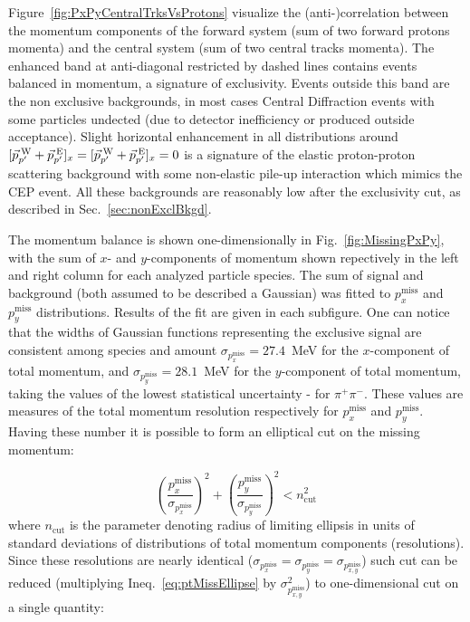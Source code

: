 Figure~\ref{fig:PxPyCentralTrksVsProtons} visualize the (anti-)correlation between the momentum components of the forward system (sum of two forward protons momenta) and the central system (sum of two central tracks momenta). The enhanced band at anti-diagonal restricted by dashed lines contains events balanced in momentum, a signature of exclusivity. Events outside this band are the non exclusive backgrounds, in most cases Central Diffraction events with some particles undected (due to detector inefficiency or produced outside acceptance). Slight horizontal enhancement in all distributions around $[\vec{p}^{\hspace*{2pt}\text{W}}_{p'}+\vec{p}^{\hspace*{2pt}\text{E}}_{p'}]_{x} = [\vec{p}^{\hspace*{2pt}\text{W}}_{p'}+\vec{p}^{\hspace*{2pt}\text{E}}_{p'}]_{x} =0$ is a signature of the elastic proton-proton scattering background with some non-elastic pile-up interaction which mimics the CEP event. All these backgrounds are reasonably low after the exclusivity cut, as described in Sec.~\ref{sec:nonExclBkgd}.

The momentum balance is shown one-dimensionally in Fig.~\ref{fig:MissingPxPy}, with the sum of $x$- and $y$-components of momentum shown repectively in the left and right column for each analyzed particle species. The sum of signal and background (both assumed to be described a Gaussian) was fitted to $p_{x}^{\text{miss}}$ and $p_{y}^{\text{miss}}$ distributions. Results of the fit are given in each subfigure. One can notice that the widths of Gaussian functions representing the exclusive signal are consistent among species and amount $\sigma_{p_{x}^{\text{miss}}}=27.4$~MeV for the $x$-component of total momentum, and $\sigma_{p_{y}^{\text{miss}}}=28.1$~MeV for the $y$-component of total momentum, taking the values of the lowest statistical uncertainty - for $\pi^{+}\pi^{-}$. These values are measures of the total momentum resolution respectively for $p_{x}^{\text{miss}}$ and $p_{y}^{\text{miss}}$. Having these number it is possible to form an elliptical cut on the missing momentum:

\begin{equation}\label{eq:ptMissEllipse}%
\left(\frac{p_{x}^{\text{miss}}}{\sigma_{p_{x}^{\text{miss}}}}\right)^{2} + \left(\frac{p_{y}^{\text{miss}}}{\sigma_{p_{y}^{\text{miss}}}}\right)^{2} < n_{\text{cut}}^{2}
\end{equation}
%
where $n_{\text{cut}}$ is the parameter denoting radius of limiting ellipsis in units of standard deviations of distributions of total momentum components (resolutions). Since these resolutions are nearly identical ($\sigma_{p_{x}^{\text{miss}}} = \sigma_{p_{y}^{\text{miss}}} = \sigma_{p_{x,y}^{\text{miss}}}$) such cut can be reduced (multiplying Ineq.~\ref{eq:ptMissEllipse} by $\sigma_{p_{x,y}^{\text{miss}}}^{2}$) to one-dimensional cut on a single quantity:

